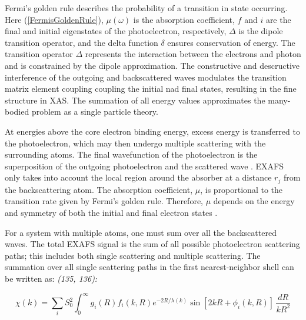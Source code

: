\noindent Fermi's golden rule describes the probability of a transition in state occurring. Here (\ref{FermisGoldenRule}), $ \mu(\omega) $ is the absorption coefficient, $ f $ and $ i $ are the final and initial eigenstates of the photoelectron, respectively, $ \Delta $ is the dipole transition operator, and the delta function $ \delta $ ensures conservation of energy. The transition operator $ \Delta $ represents the interaction between the electrons and photon and is constrained by the dipole approximation. The constructive and descructive interference of the outgoing and backscattered waves modulates the transition matrix element coupling coupling the initial nad final states, resulting in the fine structure in XAS. The summation of all energy values approximates the many-bodied problem as a single particle theory. 

At energies above the core electron binding energy, excess energy is transferred to the photoelectron, which may then undergo multiple scattering with the surrounding atoms. The final wavefunction of the photoelectron is the superposition of the outgoing photoelectron and the scattered wave \cite{anotherxafstocite}. EXAFS only takes into account the local region around the absorber at a distance $ r_j $  from the backscattering atom. The absorption coefficient, $ \mu $, is proportional to the transition rate given by Fermi’s golden rule. Therefore,  $ \mu $ depends on the energy and symmetry of both the initial and final electron states \cite{xafsXanesFermisGoldenRule}. 


For a system with multiple atoms, one must sum over all the backscattered waves. The total EXAFS signal is the sum of all possible photoelectron scattering paths; this includes both single scattering and multiple scattering. The summation over all single scattering paths in the first nearest-neighbor shell can be written as: \textit{(135, 136):}

\begin{equation}
    \label{first-nn-exafs-single-scattering}
    \chi(k) = \sum_i S_0^2 \int_{0}^{\infty} g_i(R) f_i(k, R) e^{-2R/\lambda(k)} \sin[2kR + \phi_i(k, R)]  \,\frac{dR}{kR^2} 
\end{equation}

